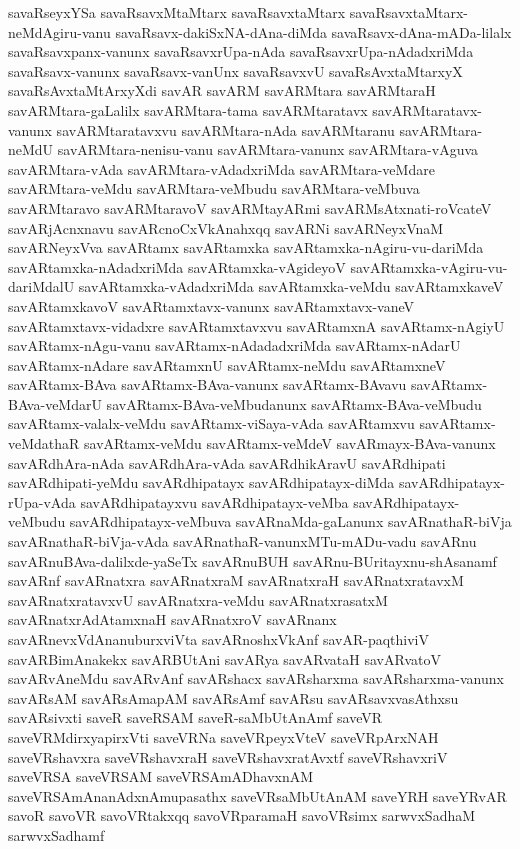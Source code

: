 {savaRseyxYSa
savaRsavxMtaMtarx
savaRsavxtaMtarx
savaRsavxtaMtarx-neMdAgiru-vanu
savaRsavx-dakiSxNA-dAna-diMda
savaRsavx-dAna-mADa-lilalx
savaRsavxpanx-vanunx
savaRsavxrUpa-nAda
savaRsavxrUpa-nAdadxriMda
savaRsavx-vanunx
savaRsavx-vanUnx
savaRsavxvU
savaRsAvxtaMtarxyX
savaRsAvxtaMtArxyXdi
savAR
savARM
savARMtara
savARMtaraH
savARMtara-gaLalilx
savARMtara-tama
savARMtaratavx
savARMtaratavx-vanunx
savARMtaratavxvu
savARMtara-nAda
savARMtaranu
savARMtara-neMdU
savARMtara-nenisu-vanu
savARMtara-vanunx
savARMtara-vAguva
savARMtara-vAda
savARMtara-vAdadxriMda
savARMtara-veMdare
savARMtara-veMdu
savARMtara-veMbudu
savARMtara-veMbuva
savARMtaravo
savARMtaravoV
savARMtayARmi
savARMsAtxnati-roVcateV
savARjAcnxnavu
savARcnoCxVkAnahxqq
savARNi
savARNeyxVnaM
savARNeyxVva
savARtamx
savARtamxka
savARtamxka-nAgiru-vu-dariMda
savARtamxka-nAdadxriMda
savARtamxka-vAgideyoV
savARtamxka-vAgiru-vu-dariMdalU
savARtamxka-vAdadxriMda
savARtamxka-veMdu
savARtamxkaveV
savARtamxkavoV
savARtamxtavx-vanunx
savARtamxtavx-vaneV
savARtamxtavx-vidadxre
savARtamxtavxvu
savARtamxnA
savARtamx-nAgiyU
savARtamx-nAgu-vanu
savARtamx-nAdadadxriMda
savARtamx-nAdarU
savARtamx-nAdare
savARtamxnU
savARtamx-neMdu
savARtamxneV
savARtamx-BAva
savARtamx-BAva-vanunx
savARtamx-BAvavu
savARtamx-BAva-veMdarU
savARtamx-BAva-veMbudanunx
savARtamx-BAva-veMbudu
savARtamx-valalx-veMdu
savARtamx-viSaya-vAda
savARtamxvu
savARtamx-veMdathaR
savARtamx-veMdu
savARtamx-veMdeV
savARmayx-BAva-vanunx
savARdhAra-nAda
savARdhAra-vAda
savARdhikAravU
savARdhipati
savARdhipati-yeMdu
savARdhipatayx
savARdhipatayx-diMda
savARdhipatayx-rUpa-vAda
savARdhipatayxvu
savARdhipatayx-veMba
savARdhipatayx-veMbudu
savARdhipatayx-veMbuva
savARnaMda-gaLanunx
savARnathaR-biVja
savARnathaR-biVja-vAda
savARnathaR-vanunxMTu-mADu-vadu
savARnu
savARnuBAva-dalilxde-yaSeTx
savARnuBUH
savARnu-BUritayxnu-shAsanamf
savARnf
savARnatxra
savARnatxraM
savARnatxraH
savARnatxratavxM
savARnatxratavxvU
savARnatxra-veMdu
savARnatxrasatxM
savARnatxrAdAtamxnaH
savARnatxroV
savARnanx
savARnevxVdAnanuburxviVta
savARnoshxVkAnf
savAR-paqthiviV
savARBimAnakekx
savARBUtAni
savARya
savARvataH
savARvatoV
savARvAneMdu
savARvAnf
savARshacx
savARsharxma
savARsharxma-vanunx
savARsAM
savARsAmapAM
savARsAmf
savARsu
savARsavxvasAthxsu
savARsivxti
saveR
saveRSAM
saveR-saMbUtAnAmf
saveVR
saveVRMdirxyapirxVti
saveVRNa
saveVRpeyxVteV
saveVRpArxNAH
saveVRshavxra
saveVRshavxraH
saveVRshavxratAvxtf
saveVRshavxriV
saveVRSA
saveVRSAM
saveVRSAmADhavxnAM
saveVRSAmAnanAdxnAmupasathx
saveVRsaMbUtAnAM
saveYRH
saveYRvAR
savoR
savoVR
savoVRtakxqq
savoVRparamaH
savoVRsimx
sarwvxSadhaM
sarwvxSadhamf
}
